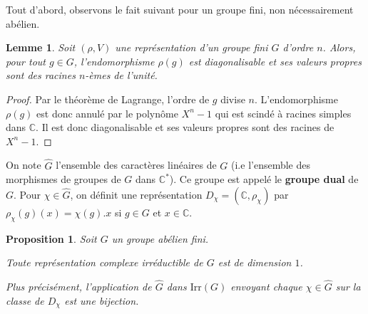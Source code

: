 \documentclass[a4paper]{article}
\theoremstyle{definition} %
\theoremstyle{plain} %
\newtheorem{Prop}[Def]{Proposition} %
\newtheorem{Lem}[Def]{Lemme} %
\theoremstyle{remark} %
\newcommand{\C}{\mathbb{C}}
\newcommand{\Irr}{\mathrm{Irr}(G)}
\begin{document}
Tout d'abord, observons le fait suivant pour un groupe fini, non nécessairement abélien.

\begin{Lem}\label{lemme:diagonalisation}
Soit $(\rho,V)$ une représentation d'un groupe fini $G$ d'ordre $n$.
Alors, pour tout $g\in G$, l'endomorphisme $\rho(g)$ est diagonalisable et ses valeurs propres sont des racines $n$-èmes de l'unité.
\end{Lem}

\begin{proof}
Par le théorème de Lagrange, l'ordre de $g$ divise $n$.
L'endomorphisme $\rho(g)$ est donc annulé par le polynôme $X^n - 1$ qui est scindé à racines simples dans $\mathbb{C}$.
Il est donc diagonalisable et ses valeurs propres sont des racines de $X^n - 1$.
\end{proof}

On note $\widehat{G}$ l'ensemble des caractères linéaires de $G$ (i.e l'ensemble des morphismes de groupes de $G$ dans $\C^*$). Ce groupe est appelé le \textbf{groupe dual} de $G$. Pour $\chi \in \widehat{G}$, on définit une représentation $D_\chi=(\C,\rho_\chi)$ par $\rho_\chi(g)(x)=\chi(g).x$ si $g\in G$ et $x\in \C$.

\begin{Prop}	
	Soit $G$ un groupe abélien fini.
	
	Toute représentation complexe irréductible de $G$ est de dimension $1$. 
	
	
	
	Plus précisément, l'application de $\widehat{G}$ dans $\Irr$  envoyant chaque $\chi\in \widehat{G}$ sur la classe de  $D_\chi$ est une bijection. 
\end{Prop}
\end{document}
